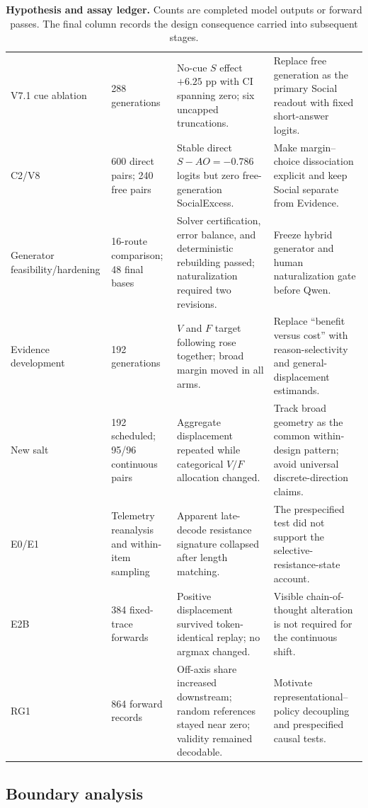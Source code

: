 \documentclass[letterpaper]{article}
\begin{document}
\begin{table}[t]
\begin{tabularx}{\textwidth}{L{1.65cm}L{2.1cm}L{3.4cm}Y}
V7.1 cue ablation & 288 generations & No-cue $S$ effect $+6.25$ pp with CI spanning zero; six uncapped truncations. & Replace free generation as the primary Social readout with fixed short-answer logits. \\
C2/V8 & 600 direct pairs; 240 free pairs & Stable direct $S-AO=-0.786$ logits but zero free-generation SocialExcess. & Make margin--choice dissociation explicit and keep Social separate from Evidence. \\
Generator feasibility/hardening & 16-route comparison; 48 final bases & Solver certification, error balance, and deterministic rebuilding passed; naturalization required two revisions. & Freeze hybrid generator and human naturalization gate before Qwen. \\
Evidence development & 192 generations & $V$ and $F$ target following rose together; broad margin moved in all arms. & Replace ``benefit versus cost'' with reason-selectivity and general-displacement estimands. \\
New salt & 192 scheduled; 95/96 continuous pairs & Aggregate displacement repeated while categorical $V/F$ allocation changed. & Track broad geometry as the common within-design pattern; avoid universal discrete-direction claims. \\
E0/E1 & Telemetry reanalysis and within-item sampling & Apparent late-decode resistance signature collapsed after length matching. & The prespecified test did not support the selective-resistance-state account. \\
E2B & 384 fixed-trace forwards & Positive displacement survived token-identical replay; no argmax changed. & Visible chain-of-thought alteration is not required for the continuous shift. \\
RG1 & 864 forward records & Off-axis share increased downstream; random references stayed near zero; validity remained decodable. & Motivate representational--policy decoupling and prespecified causal tests. \\
\bottomrule
\end{tabularx}
\caption{\textbf{Hypothesis and assay ledger.} Counts are completed model outputs or forward passes.  The final column records the design consequence carried into subsequent stages.}
\label{tab:supp-history}
\end{table}

\subsection{Boundary analysis}
\end{document}
